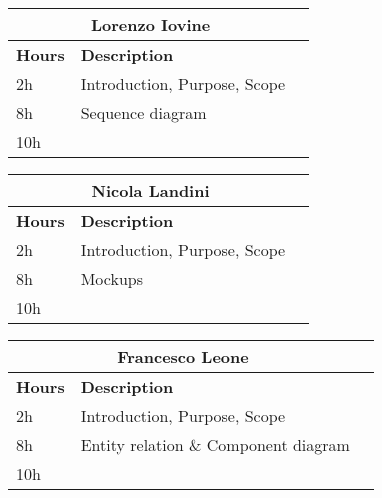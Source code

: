 \begin{table}[H]
    \centering
    \begin{tabular}{|l|l|l|}
        \multicolumn{2}{c}{\textbf{Lorenzo Iovine}}                   \\
        \hline
        \textbf{Hours} & \textbf{Description}          \\\hline
        2h             & Introduction, Purpose, Scope                           \\\hline
        8h             & Sequence diagram                                       \\\hline\hline
        10h            &                                                        \\\hline
    \end{tabular}
\end{table}
\bigskip
\begin{table}[H]
    \centering
    \begin{tabular}{|l|l|l|}
        \multicolumn{2}{c}{\textbf{Nicola Landini}}                      \\
        \hline
        \textbf{Hours} & \textbf{Description}          \\\hline
        2h             & Introduction, Purpose, Scope                           \\\hline
        8h             & Mockups                                                \\\hline\hline
        10h            &                                                        \\\hline
    \end{tabular}
\end{table}
\bigskip
\begin{table}[H]
    \centering
    \begin{tabular}{|l|l|l|}
        \multicolumn{2}{c}{\textbf{Francesco Leone}}                      \\
        \hline
        \textbf{Hours} & \textbf{Description}          \\\hline
        2h             & Introduction, Purpose, Scope                           \\\hline
        8h             & Entity relation \& Component diagram                   \\\hline\hline
        10h            &                                                        \\\hline
    \end{tabular}
\end{table}